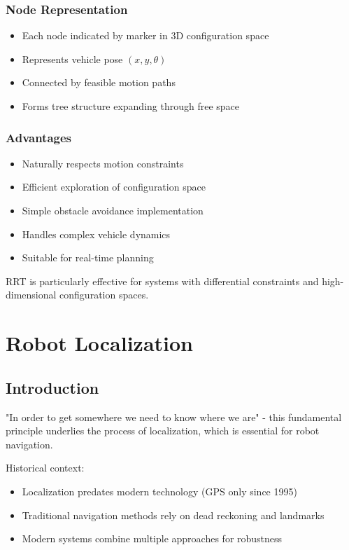 \documentclass[openany]{book}
\theoremstyle{definition}
\theoremstyle{remark}
\newcommand{\definitionbox}[1]{
\begin{tcolorbox}[colback=blue!5,colframe=blue!40!black,title=Definition]
 #1
\end{tcolorbox}
}
\newcommand{\note}[1]{
\begin{tcolorbox}[colback=green!5,colframe=green!40!black,title=Note]
 #1
\end{tcolorbox}
}
\begin{document}
\subsection{Node Representation}
\begin{itemize}
   \item Each node indicated by marker in 3D configuration space
   \item Represents vehicle pose $(x,y,\theta)$
   \item Connected by feasible motion paths
   \item Forms tree structure expanding through free space
\end{itemize}

\subsection{Advantages}
\begin{itemize}
   \item Naturally respects motion constraints
   \item Efficient exploration of configuration space
   \item Simple obstacle avoidance implementation
   \item Handles complex vehicle dynamics
   \item Suitable for real-time planning
\end{itemize}

\note{RRT is particularly effective for systems with differential constraints and high-dimensional configuration spaces.}

\chapter{Robot Localization}

\section{Introduction}

\definitionbox{"In order to get somewhere we need to know where we are" - this fundamental principle underlies the process of localization, which is essential for robot navigation.}

Historical context:
\begin{itemize}
   \item Localization predates modern technology (GPS only since 1995)
   \item Traditional navigation methods rely on dead reckoning and landmarks
   \item Modern systems combine multiple approaches for robustness
\end{itemize}
\end{document}
